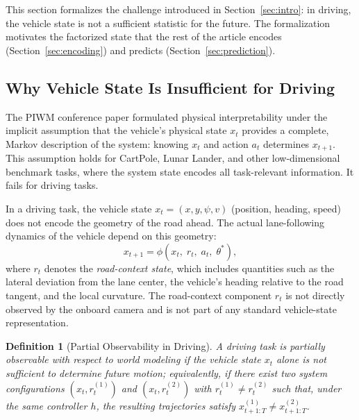 \documentclass[preprint,12pt]{elsarticle}
\newtheorem{definition}{Definition}
\begin{document}
This section formalizes the challenge introduced in Section~\ref{sec:intro}:
in driving, the vehicle state is not a sufficient statistic for the future.
The formalization motivates the factorized state that the rest of the article
encodes (Section~\ref{sec:encoding}) and predicts (Section~\ref{sec:prediction}).

\subsection{Why Vehicle State Is Insufficient for Driving}

The PIWM conference paper formulated physical interpretability under the implicit
assumption that the vehicle's physical state $x_t$ provides a complete, Markov
description of the system: knowing $x_t$ and action $a_t$ determines $x_{t+1}$.
This assumption holds for CartPole, Lunar Lander, and other low-dimensional
benchmark tasks, where the system state encodes all task-relevant information.
It fails for driving tasks.

In a driving task, the vehicle state $x_t = (x, y, \psi, v)$ (position, heading,
speed) does not encode the geometry of the road ahead.
The actual lane-following dynamics of the vehicle depend on this geometry:
\begin{equation}
    x_{t+1} = \phi(x_t,\; r_t,\; a_t,\; \theta^*),
    \label{eq:augmented_dyn}
\end{equation}
where $r_t$ denotes the \emph{road-context state}, which includes quantities such
as the lateral deviation from the lane center, the vehicle's heading relative to
the road tangent, and the local curvature.
The road-context component $r_t$ is not directly observed by the onboard camera
and is not part of any standard vehicle-state representation.

\begin{definition}[Partial Observability in Driving]
\label{def:partial_obs}
A driving task is \emph{partially observable} with respect to world modeling if
the vehicle state $x_t$ alone is not sufficient to determine future motion;
equivalently, if there exist two system configurations $(x_t, r_t^{(1)})$ and
$(x_t, r_t^{(2)})$ with $r_t^{(1)} \neq r_t^{(2)}$ such that, under the same
controller $h$, the resulting trajectories satisfy
$x_{t+1:T}^{(1)} \neq x_{t+1:T}^{(2)}$.
\end{definition}
\end{document}
